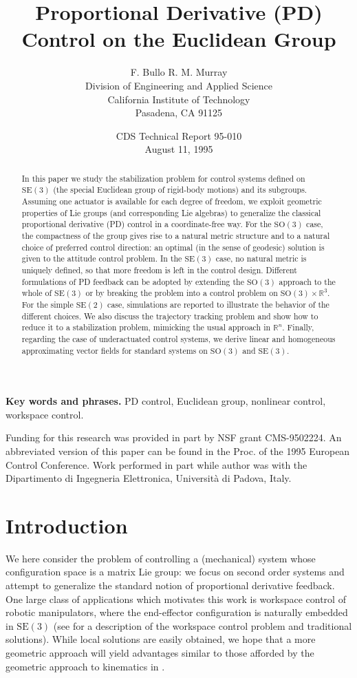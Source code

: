 \documentclass[11pt]{article}
\title{Proportional Derivative (PD) Control on the Euclidean Group}
\author{F. Bullo \qquad R. M. Murray\\[0.5em]
Division of Engineering and Applied Science\\
California Institute of Technology\\
Pasadena, CA 91125}
\date{CDS Technical Report 95-010\\August 11, 1995}
\newcommand{\SO}{\mathrm{SO}}
\newcommand{\SE}{\mathrm{SE}}
\newcommand{\R}{\mathbb R}
\begin{document}
\maketitle

\begin{abstract}
In this paper we study the stabilization problem for control systems defined on $\SE(3)$ (the special Euclidean group of rigid-body motions) and its subgroups. Assuming one actuator is available for each degree of freedom, we exploit geometric properties of Lie groups (and corresponding Lie algebras) to generalize the classical proportional derivative (PD) control in a coordinate-free way. For the $\SO(3)$ case, the compactness of the group gives rise to a natural metric structure and to a natural choice of preferred control direction: an optimal (in the sense of geodesic) solution is given to the attitude control problem. In the $\SE(3)$ case, no natural metric is uniquely defined, so that more freedom is left in the control design. Different formulations of PD feedback can be adopted by extending the $\SO(3)$ approach to the whole of $\SE(3)$ or by breaking the problem into a control problem on $\SO(3)\times\R^3$. For the simple $\SE(2)$ case, simulations are reported to illustrate the behavior of the different choices. We also discuss the trajectory tracking problem and show how to reduce it to a stabilization problem, mimicking the usual approach in $\R^n$. Finally, regarding the case of underactuated control systems, we derive linear and homogeneous approximating vector fields for standard systems on $\SO(3)$ and $\SE(3)$.
\end{abstract}

\noindent\textbf{Key words and phrases.} PD control, Euclidean group, nonlinear control, workspace control.

\noindent Funding for this research was provided in part by NSF grant CMS-9502224. An abbreviated version of this paper can be found in the Proc. of the 1995 European Control Conference. Work performed in part while author was with the Dipartimento di Ingegneria Elettronica, Universit\`a di Padova, Italy.

\tableofcontents

\section{Introduction}\label{sec:introduction}
We here consider the problem of controlling a (mechanical) system whose configuration space is a matrix Lie group: we focus on second order systems and attempt to generalize the standard notion of proportional derivative feedback. One large class of applications which motivates this work is workspace control of robotic manipulators, where the end-effector configuration is naturally embedded in $\SE(3)$ (see \cite{26} for a description of the workspace control problem and traditional solutions). While local solutions are easily obtained, we hope that a more geometric approach will yield advantages similar to those afforded by the geometric approach to kinematics in \cite{26}.
\end{document}
